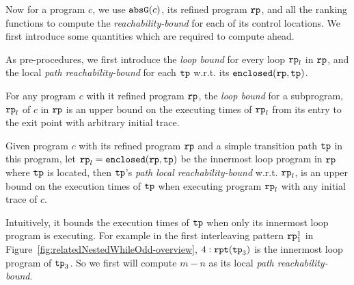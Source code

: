 
Now for a program $c$, we use $\mathtt{abs}{\mathtt{G}}(c)$, its refined program $\mathtt{rp}$, and all the ranking functions to compute the \emph{reachability-bound} for each of its control locations.
We first introduce some quantities which are required to compute ahead.

As pre-procedures, we first introduce the \emph{loop bound} for every loop $\mathtt{rp}_l$ in $\mathtt{rp}$, and the local \emph{path reachability-bound} for each $\mathtt{tp}$ w.r.t. its $\mathtt{enclosed}(\mathtt{rp}, \mathtt{tp})$.
\begin{defn}
 For any program $c$ with it refined program $\mathtt{rp}$,
 the \emph{loop bound}
 for a subprogram, $\mathtt{rp}_l$ of $c$ in $\mathtt{rp}$ is an upper bound on the executing times of $\mathtt{rp}_l$ from its entry to the exit point with arbitrary initial trace.
\end{defn}
% 
\begin{defn}
 Given program $c$ with its refined program $\mathtt{rp}$ and a simple transition path $\mathtt{tp}$ in this program, 
 let $\mathtt{rp}_l = \mathtt{enclosed}(\mathtt{rp}, \mathtt{tp})$ be the innermost loop program in $\mathtt{rp}$ where $\mathtt{tp}$ is located,
 then $\mathtt{tp}$'s \emph{path local reachability-bound} w.r.t. $\mathtt{rp}_l$, 
 is an upper bound on the execution times of $\mathtt{tp}$ when executing program $\mathtt{rp}_l$ with any initial trace of $c$.
\end{defn}
Intuitively, it bounds the execution times of $\mathtt{tp}$ when only its innermost loop program is executing.
For example in the first interleaving pattern $\mathtt{rp}_1^1$ in Figure~\ref{fig:relatedNestedWhileOdd-overview}, 
$4:\mathtt{rpt}(\mathtt{tp}_3)$ is the innermost loop program of $\mathtt{tp}_3$.
So we first will compute $m - n$ as its local \emph{path reachability-bound}.

